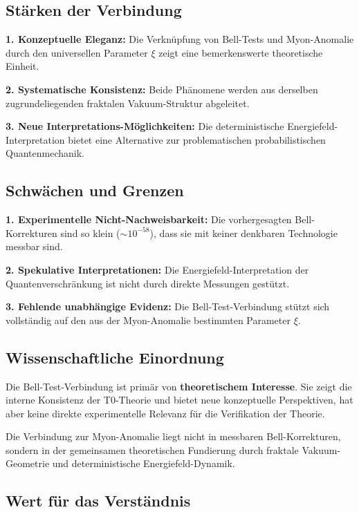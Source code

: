 \documentclass[12pt,a4paper]{article}
\begin{document}
	\begin{critical}
		\subsection{St\"arken der Verbindung}
		
		\textbf{1. Konzeptuelle Eleganz:}
		Die Verkn\"upfung von Bell-Tests und Myon-Anomalie durch den universellen Parameter $\xi$ zeigt eine bemerkenswerte theoretische Einheit.
		
		\textbf{2. Systematische Konsistenz:}
		Beide Ph\"anomene werden aus derselben zugrundeliegenden fraktalen Vakuum-Struktur abgeleitet.
		
		\textbf{3. Neue Interpretations-M\"oglichkeiten:}
		Die deterministische Energiefeld-Interpretation bietet eine Alternative zur problematischen probabilistischen Quantenmechanik.
		
		\subsection{Schw\"achen und Grenzen}
		
		\textbf{1. Experimentelle Nicht-Nachweisbarkeit:}
		Die vorhergesagten Bell-Korrekturen sind so klein ($\sim 10^{-58}$), dass sie mit keiner denkbaren Technologie messbar sind.
		
		\textbf{2. Spekulative Interpretationen:}
		Die Energiefeld-Interpretation der Quantenverschr\"ankung ist nicht durch direkte Messungen gest\"utzt.
		
		\textbf{3. Fehlende unabh\"angige Evidenz:}
		Die Bell-Test-Verbindung st\"utzt sich vollst\"andig auf den aus der Myon-Anomalie bestimmten Parameter $\xi$.
		
		\subsection{Wissenschaftliche Einordnung}
		
		Die Bell-Test-Verbindung ist prim\"ar von \textbf{theoretischem Interesse}. Sie zeigt die interne Konsistenz der T0-Theorie und bietet neue konzeptuelle Perspektiven, hat aber keine direkte experimentelle Relevanz f\"ur die Verifikation der Theorie.
		
		Die Verbindung zur Myon-Anomalie liegt nicht in messbaren Bell-Korrekturen, sondern in der gemeinsamen theoretischen Fundierung durch fraktale Vakuum-Geometrie und deterministische Energiefeld-Dynamik.
		
		\subsection{Wert f\"ur das Verst\"andnis}
		

\end{critical}
\end{document}
